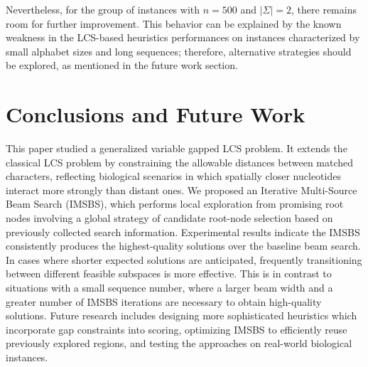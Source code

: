 \documentclass[runningheads]{llncs}
\begin{document}
Nevertheless, for the group of instances with $n=500$ and $|\Sigma|=2$, there remains room for further improvement. This behavior can be explained by the known weakness in the LCS-based heuristics performances on instances characterized by small alphabet sizes and long sequences; therefore, alternative strategies should be explored, as mentioned in the future work section.

  	
  	

\section{Conclusions and Future Work}
\label{sec: conclusions}

This paper studied a generalized variable gapped LCS problem. It extends the classical LCS problem by constraining the allowable distances between matched characters, reflecting biological scenarios in which spatially closer nucleotides interact more strongly than distant ones.  
We proposed an Iterative Multi-Source Beam Search (IMSBS), which performs local exploration from promising root nodes involving a global strategy of candidate root-node selection based on previously collected search information. Experimental results indicate the IMSBS consistently produces the highest-quality solutions over the baseline beam search. In cases where shorter expected solutions are anticipated, frequently transitioning between different feasible subspaces is more effective. This is in contrast to situations with a small sequence number, where a larger beam width and a greater number of IMSBS iterations are necessary to obtain high-quality solutions.  %
 Future research includes designing more sophisticated heuristics which incorporate gap constraints into scoring, optimizing IMSBS to efficiently reuse previously explored regions, %
 and testing the approaches on real-world biological instances. %
 \\
\end{document}
